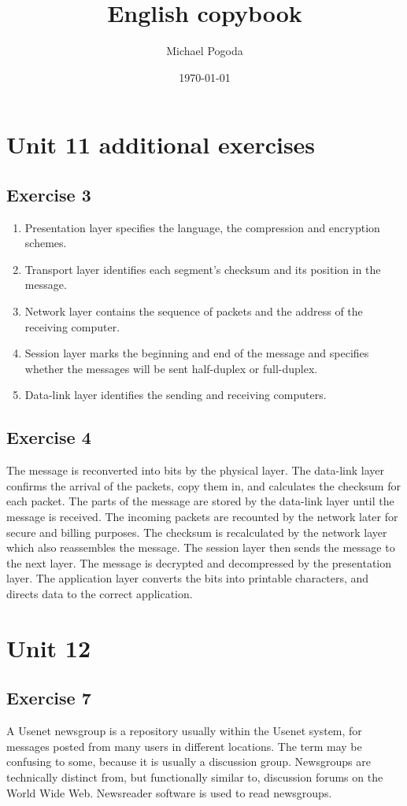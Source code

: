 \documentclass[a5paper,10pt,notitlepage,pdftex,headsepline]{scrartcl}
\author{Michael Pogoda}
\title{English copybook}
\date{\today}
\begin{document}
\section{Unit 11 additional exercises}
  \label{sec:unit_11}
  \subsection{Exercise 3}
    \begin{enumerate}
      \item Presentation layer specifies the language, the compression and
        encryption schemes.
      \item Transport layer identifies each segment's checksum and its
        position in the message.
      \item Network layer contains the sequence of packets and the address of
        the receiving computer.
      \item Session layer marks the beginning and end of the message and
        specifies whether the messages will be sent half-duplex or
        full-duplex.
      \item Data-link layer identifies the sending and receiving computers.
    \end{enumerate}
  \subsection{Exercise 4}
    The message is reconverted into bits by the physical layer.
    The data-link layer confirms the arrival of the packets, copy them in, and
    calculates the checksum for each packet.
    The parts of the message are stored by the data-link layer until the
    message is received.
    The incoming packets are recounted by the network later for secure and
    billing purposes.
    The checksum is recalculated by the network layer which also reassembles
    the message.
    The session layer then sends the message to the next layer.
    The message is decrypted and decompressed by the presentation layer.
    The application layer converts the bits into printable characters, and
    directs data to the correct application.
\section{Unit 12}
  \label{sec:unit_12}
  \subsection{Exercise 7}
    A Usenet newsgroup is a repository usually within the Usenet system, for
    messages posted from many users in different locations.
    The term may be confusing to some, because it is usually a discussion
    group.
    Newsgroups are technically distinct from, but functionally similar to,
    discussion forums on the World Wide Web.
    Newsreader software is used to read newsgroups.
\end{document}
